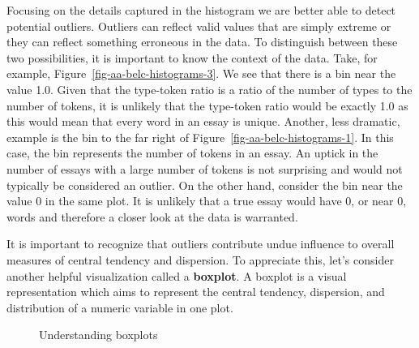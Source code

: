 \documentclass[
  letterpaper,
  DIV=11,
  numbers=noendperiod]{scrreprt}
\theoremstyle{definition}
\theoremstyle{remark}
\begin{document}
Focusing on the details captured in the histogram we are better able to
detect potential outliers. Outliers can reflect valid values that are
simply extreme or they can reflect something erroneous in the data. To
distinguish between these two possibilities, it is important to know the
context of the data. Take, for example,
Figure~\ref{fig-aa-belc-histograms-3}. We see that there is a bin near
the value 1.0. Given that the type-token ratio is a ratio of the number
of types to the number of tokens, it is unlikely that the type-token
ratio would be exactly 1.0 as this would mean that every word in an
essay is unique. Another, less dramatic, example is the bin to the far
right of Figure~\ref{fig-aa-belc-histograms-1}. In this case, the bin
represents the number of tokens in an essay. An uptick in the number of
essays with a large number of tokens is not surprising and would not
typically be considered an outlier. On the other hand, consider the bin
near the value 0 in the same plot. It is unlikely that a true essay
would have 0, or near 0, words and therefore a closer look at the data
is warranted.

It is important to recognize that outliers contribute undue influence to
overall measures of central tendency and dispersion. To appreciate this,
let's consider another helpful visualization called a \textbf{boxplot}.
A boxplot is a visual representation which aims to represent the central
tendency, dispersion, and distribution of a numeric variable in one
plot.

\begin{figure}[H]

\begin{minipage}{\linewidth}



\end{minipage}%
\newline
\begin{minipage}{\linewidth}



\end{minipage}%

\caption{\label{fig-aa-belc-histogram-boxplot}Understanding boxplots}

\end{figure}%
\end{document}
